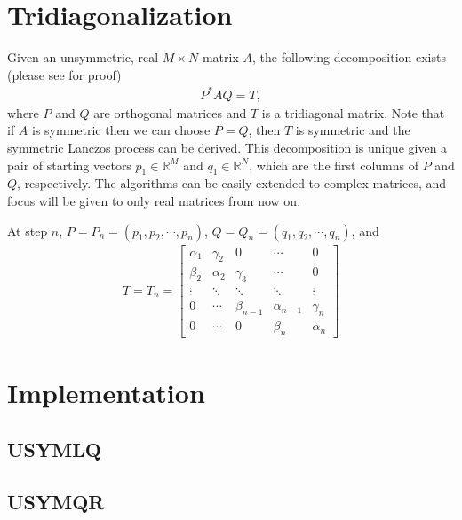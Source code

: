 \documentclass[10pt,letterpaper]{article}
\def\R{\mathbb{R}}
\def\alfa{\alpha}
\def\gama{\gamma}
\begin{document}
\section{Tridiagonalization}
Given an unsymmetric, real $M \times N$ matrix $A$, the following 
decomposition exists (please see \cite{saunders:1988} for proof)
\begin{align}
    P^* A Q = T,
\end{align}
where $P$ and $Q$ are orthogonal matrices and $T$ is a tridiagonal 
matrix. Note that if $A$ is symmetric then we can choose $P =Q$, then
$T$ is symmetric and the symmetric Lanczos process can be derived. This
decomposition is unique given a pair of starting vectors 
$p_1 \in \R^M$ and $q_1 \in \R^N$, which are the first columns of $P$
and $Q$, respectively. 
The algorithms can be easily extended to complex matrices, and focus will 
be given to only real matrices from now on. 

At step $n$, $P = P_n = (p_1, p_2, \cdots, p_n)$, 
$Q = Q_n = (q_1, q_2, \cdots, q_n)$, and 
\begin{align} 
    T = T_n = 
    \begin{bmatrix}
            \alfa_1 & \gama_2 & 0       & \cdots & 0      \\
            \beta_2 & \alfa_2 & \gama_3 & \cdots & 0      \\
            \vdots  & \ddots  & \ddots  & \ddots & \vdots \\
            0       & \cdots  & \beta_{n-1} & \alfa_{n-1} & \gama_n \\
            0       & \cdots  & 0           & \beta_n     & \alfa_n
    \end{bmatrix}
\end{align}

\section{Implementation} 

\subsection{USYMLQ}

\subsection{USYMQR}

\end{document}
